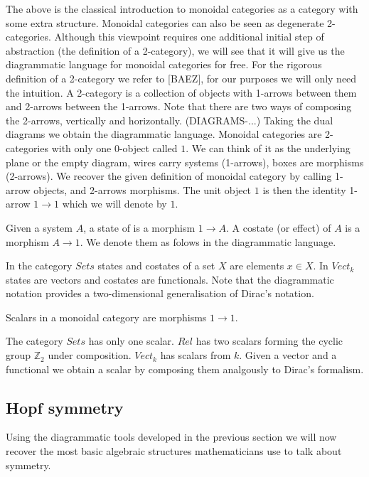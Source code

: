 \documentclass{article}
\newenvironment{definition}[1][Definition]{\begin{trivlist}
\item[\hskip \labelsep {\bfseries #1}]}{\end{trivlist}}
\newenvironment{example}[1][Example]{\begin{trivlist}
\item[\hskip \labelsep {\bfseries #1}]}{\end{trivlist}}
\begin{document}
The above is the classical introduction to monoidal categories as a category with some extra structure. Monoidal categories can also be seen as degenerate 2-categories. Although this viewpoint requires one additional initial step of abstraction (the definition of a 2-category), we will see that it will give us the diagrammatic language for monoidal categories for free. For the rigorous definition of a 2-category we refer to [BAEZ], for our purposes we will only need the intuition. A 2-category is a collection of objects with 1-arrows between them and 2-arrows between the 1-arrows. Note that there are two ways of composing the 2-arrows, vertically and horizontally. (DIAGRAMS-...) Taking the dual diagrams we obtain the diagrammatic language. Monoidal categories are 2-categories with only one 0-object called $1$. We can think of it as the underlying plane or the empty diagram, wires carry systems (1-arrows), boxes are morphisms (2-arrows). We recover the given definition of monoidal category by calling 1-arrow objects, and 2-arrows morphisms. The unit object $1$ is then the identity 1-arrow $1 \rightarrow 1$ which we will denote by $1$. 
\begin{definition}
Given a system $A$, a state of is a morphism $1 \rightarrow A$. A costate (or effect) of $A$ is a morphism $A \rightarrow 1$. We denote them as folows in the diagrammatic language.
\end{definition}
\begin{example}
In the category $Sets$ states and costates of a set $X$ are elements $x\in X$. In $Vect_k$ states are vectors and costates are functionals. Note that the diagrammatic notation provides a two-dimensional generalisation of Dirac's notation.
\end{example}
\begin{definition}
Scalars in a monoidal category are morphisms $1 \rightarrow 1$.
\end{definition}
The category $Sets$ has only one scalar. $Rel$ has two scalars forming the cyclic group $\mathbb{Z}_2$ under composition. $Vect_k$ has scalars from $k$. Given a vector and a functional we obtain a scalar by composing them analgously to Dirac's formalism.

\subsection{Hopf symmetry}
Using the diagrammatic tools developed in the previous section we will now recover the most basic algebraic structures mathematicians use to talk about symmetry.
\end{document}
